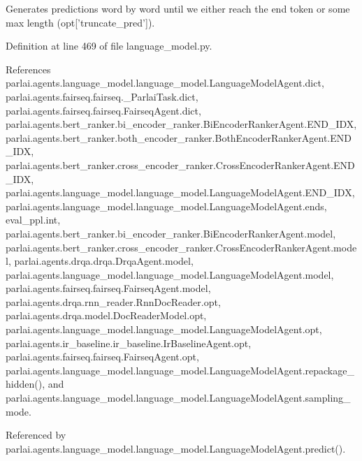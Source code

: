 \begin{DoxyVerb}Generates predictions word by word until we either reach the end token
   or some max length (opt['truncate_pred']).
\end{DoxyVerb}
 

Definition at line 469 of file language\+\_\+model.\+py.



References parlai.\+agents.\+language\+\_\+model.\+language\+\_\+model.\+Language\+Model\+Agent.\+dict, parlai.\+agents.\+fairseq.\+fairseq.\+\_\+\+Parlai\+Task.\+dict, parlai.\+agents.\+fairseq.\+fairseq.\+Fairseq\+Agent.\+dict, parlai.\+agents.\+bert\+\_\+ranker.\+bi\+\_\+encoder\+\_\+ranker.\+Bi\+Encoder\+Ranker\+Agent.\+E\+N\+D\+\_\+\+I\+DX, parlai.\+agents.\+bert\+\_\+ranker.\+both\+\_\+encoder\+\_\+ranker.\+Both\+Encoder\+Ranker\+Agent.\+E\+N\+D\+\_\+\+I\+DX, parlai.\+agents.\+bert\+\_\+ranker.\+cross\+\_\+encoder\+\_\+ranker.\+Cross\+Encoder\+Ranker\+Agent.\+E\+N\+D\+\_\+\+I\+DX, parlai.\+agents.\+language\+\_\+model.\+language\+\_\+model.\+Language\+Model\+Agent.\+E\+N\+D\+\_\+\+I\+DX, parlai.\+agents.\+language\+\_\+model.\+language\+\_\+model.\+Language\+Model\+Agent.\+ends, eval\+\_\+ppl.\+int, parlai.\+agents.\+bert\+\_\+ranker.\+bi\+\_\+encoder\+\_\+ranker.\+Bi\+Encoder\+Ranker\+Agent.\+model, parlai.\+agents.\+bert\+\_\+ranker.\+cross\+\_\+encoder\+\_\+ranker.\+Cross\+Encoder\+Ranker\+Agent.\+model, parlai.\+agents.\+drqa.\+drqa.\+Drqa\+Agent.\+model, parlai.\+agents.\+language\+\_\+model.\+language\+\_\+model.\+Language\+Model\+Agent.\+model, parlai.\+agents.\+fairseq.\+fairseq.\+Fairseq\+Agent.\+model, parlai.\+agents.\+drqa.\+rnn\+\_\+reader.\+Rnn\+Doc\+Reader.\+opt, parlai.\+agents.\+drqa.\+model.\+Doc\+Reader\+Model.\+opt, parlai.\+agents.\+language\+\_\+model.\+language\+\_\+model.\+Language\+Model\+Agent.\+opt, parlai.\+agents.\+ir\+\_\+baseline.\+ir\+\_\+baseline.\+Ir\+Baseline\+Agent.\+opt, parlai.\+agents.\+fairseq.\+fairseq.\+Fairseq\+Agent.\+opt, parlai.\+agents.\+language\+\_\+model.\+language\+\_\+model.\+Language\+Model\+Agent.\+repackage\+\_\+hidden(), and parlai.\+agents.\+language\+\_\+model.\+language\+\_\+model.\+Language\+Model\+Agent.\+sampling\+\_\+mode.



Referenced by parlai.\+agents.\+language\+\_\+model.\+language\+\_\+model.\+Language\+Model\+Agent.\+predict().

